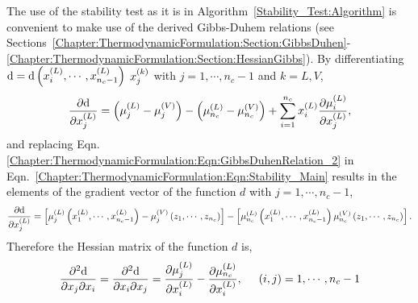 The use of the stability test as it is in Algorithm~\ref{Stability_Test:Algorithm} is convenient to make use of the derived Gibbs-Duhem relations (see Sections~\ref{Chapter:ThermodynamicFormulation:Section:GibbsDuhen}-\ref{Chapter:ThermodynamicFormulation:Section:HessianGibbs}). By differentiating $\d=\d\left(\mfr[x]{i}{L}, \cdots, \mfr[x]{n_{c}-1}{L}\right)$ \wrt $\mfr[x]{j}{k}$ with $j=1,\cdots,n_{c}-1$ and $k=L,V$,
\begin{equation}
   \frc{\partial\d}{\partial\mfr[x]{j}{L}} = \left(\mfr[\mu]{j}{L}-\mfr[\mu]{j}{V}\right) - \left(\mfr[\mu]{n_{c}}{L}-\mfr[\mu]{n_{c}}{V}\right) + \summation_{i=1}^{n_{c}}\mfr[x]{i}{L}\frc{\partial\mfr[\mu]{i}{L}}{\partial\mfr[x]{j}{L}},
\end{equation}
and replacing Eqn.\ref{Chapter:ThermodynamicFormulation:Eqn:GibbsDuhenRelation_2} in Eqn.~\ref{Chapter:ThermodynamicFormulation:Eqn:Stability_Main} results in the elements of the gradient vector of the function $d$ with $j=1,\cdots,n_{c}-1$,
\begin{equation}
   \frc{\partial\d}{\partial\mfr[x]{j}{L}} = \left[\mfr[\mu]{j}{L}\left(\mfr[x]{1}{L},\cdots,\mfr[x]{n_{c}-1}{L}\right) - \mfr[\mu]{j}{V}\left(z_{1},\cdots,z_{n_{c}}\right)\right] - \left[\mfr[\mu]{n_{c}}{L}\left(\mfr[x]{1}{L},\cdots,\mfr[x]{n_{c}-1}{L}\right) \mfr[\mu]{n_{c}}{V}\left(z_{1},\cdots,z_{n_{c}}\right)\right].
\end{equation}
Therefore the Hessian matrix of the function $d$ is,
\begin{equation}
   \frc{\partial^{2}\d}{\partial x_{j}\partial x_{i}} =  \frc{\partial^{2}\d}{\partial x_{i}\partial x_{j}} = \frc{\partial\mfr[\mu]{j}{L}}{\partial\mfr[x]{i}{L}} - \frc{\partial\mfr[\mu]{n_{c}}{L}}{\partial\mfr[x]{i}{L}}, \hspace{.5cm} (i,j)=1,\cdots,n_{c}-1
\end{equation}
